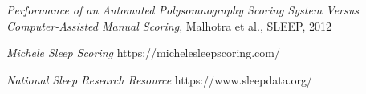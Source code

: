 \documentclass[10pt,a4paper]{report}
\begin{document}
\begin{thebibliography}{9}
\textit{Performance of an Automated Polysomnography Scoring System Versus
Computer-Assisted Manual Scoring}, Malhotra et al., SLEEP, 2012

\textit{Michele Sleep Scoring} https://michelesleepscoring.com/

\textit{National Sleep Research Resource} https://www.sleepdata.org/
\end{thebibliography}
\end{document}
